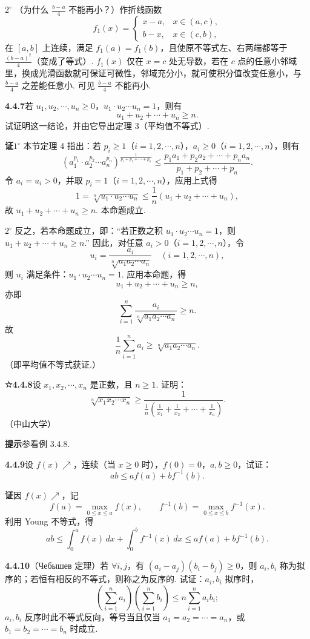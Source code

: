 \documentclass[UTF8,12pt,a4paper,fontset=fandol]{ctexart}
\begin{document}
$2^\circ$ （为什么 $\frac{b-a}{4}$ 不能再小？）作折线函数
\[
f_1(x)=
\begin{cases}
x-a,& x\in(a,c),\\
b-x,& x\in(c,b),
\end{cases}
\]
在 $[a,b]$ 上连续，满足 $f_1(a)=f_1(b)$，且使原不等式左、右两端都等于 $\frac{(b-a)^2}{4}$（变成了等式）. $f_1(x)$ 仅在 $x=c$ 处无导数，若在 $c$ 点的任意小邻域里，换成光滑函数就可保证可微性，邻域充分小，就可使积分值改变任意小，与 $\frac{b-a}{4}$ 之差能任意小. 可见 $\frac{b-a}{4}$ 不能再小.

\noindent\textbf{4.4.7}\quad 若 $u_1,u_2,\cdots,u_n\ge0$，$u_1\cdot u_2\cdots u_n=1$，则有
\[
u_1+u_2+\cdots+u_n\ge n.
\]
试证明这一结论，并由它导出定理 3（平均值不等式）.

\noindent\textbf{证}\quad $1^\circ$ 本节定理 4 指出：若 $p_i\ge1$（$i=1,2,\cdots,n$），$a_i\ge0$（$i=1,2,\cdots,n$），则有
\[
\left(a_1^{p_1}\cdot a_2^{p_2}\cdots a_n^{p_n}\right)^{\frac1{p_1+p_2+\cdots+p_n}}
\le\frac{p_1a_1+p_2a_2+\cdots+p_na_n}{p_1+p_2+\cdots+p_n}.
\]
令 $a_i=u_i>0$，并取 $p_i=1$（$i=1,2,\cdots,n$），应用上式得
\[
1=\sqrt[n]{u_1\cdot u_2\cdots u_n}
\le\frac1n(u_1+u_2+\cdots+u_n),
\]
故 $u_1+u_2+\cdots+u_n\ge n$. 本命题成立.

$2^\circ$ 反之，若本命题成立，即：“若正数之积 $u_1\cdot u_2\cdots u_n=1$，则 $u_1+u_2+\cdots+u_n\ge n$.” 因此，对任意 $a_i>0$（$i=1,2,\cdots,n$），令
\[
u_i=\frac{a_i}{\sqrt[n]{a_1a_2\cdots a_n}}\quad(i=1,2,\cdots,n),
\]
则 $u_i$ 满足条件：$u_1\cdot u_2\cdots u_n=1$. 应用本命题，得
\[
u_1+u_2+\cdots+u_n\ge n,
\]
亦即
\[
\sum_{i=1}^n\frac{a_i}{\sqrt[n]{a_1a_2\cdots a_n}}\ge n.
\]
故
\[
\frac1n\sum_{i=1}^n a_i\ge\sqrt[n]{a_1a_2\cdots a_n}.
\]
（即平均值不等式获证.）

\noindent\textbf{☆4.4.8}\quad 设 $x_1,x_2,\cdots,x_n$ 是正数，且 $n\ge1$. 证明：
\[
\sqrt[n]{x_1x_2\cdots x_n}
\ge
\frac1{\frac1n\left(\frac1{x_1}+\frac1{x_2}+\cdots+\frac1{x_n}\right)}.
\]
（中山大学）

\noindent\textbf{提示}\quad 参看例 3.4.8.

\noindent\textbf{4.4.9}\quad 设 $f(x)\nearrow$，连续（当 $x\ge0$ 时），$f(0)=0$，$a,b\ge0$，试证：
\[
ab\le af(a)+bf^{-1}(b).
\]

\noindent\textbf{证}\quad 因 $f(x)\nearrow$，记
\[
f(a)=\max_{0\le x\le a}f(x),\qquad
f^{-1}(b)=\max_{0\le x\le b}f^{-1}(x).
\]
利用 Young 不等式，得
\[
ab\le\int_0^a f(x)\,dx+\int_0^b f^{-1}(x)\,dx
\le af(a)+bf^{-1}(b).
\]

\noindent\textbf{4.4.10}\quad （Чебышев 定理）若 $\forall i,j$，有 $(a_i-a_j)(b_i-b_j)\ge0$，则 $a_i,b_i$ 称为拟序的；若恒有相反的不等式，则称之为反序的. 试证：$a_i,b_i$ 拟序时，
\[
\left(\sum_{i=1}^n a_i\right)\left(\sum_{i=1}^n b_i\right)
\le n\sum_{i=1}^n a_i b_i;
\]
$a_i,b_i$ 反序时此不等式反向，等号当且仅当 $a_1=a_2=\cdots=a_n$，或 $b_1=b_2=\cdots=b_n$ 时成立.
\end{document}

